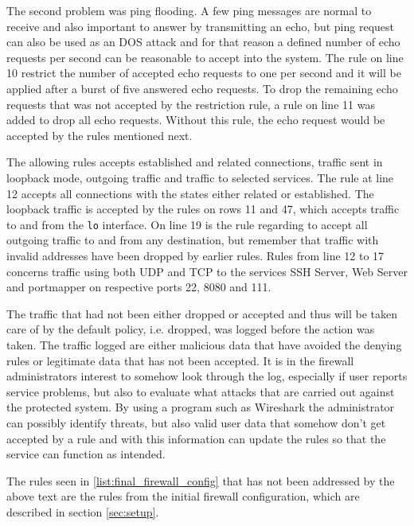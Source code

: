 The second problem was ping flooding. A few ping messages are normal to receive and also important to answer by transmitting an echo, but ping request can also be used as an DOS attack and for that reason a defined number of echo requests per second can be reasonable to accept into the system. The rule on line 10 restrict the number of accepted echo requests to one per second and it will be applied after a burst of five answered echo requests. To drop the remaining echo requests that was not accepted by the restriction rule, a rule on line 11 was added to drop all echo requests. Without this rule, the echo request would be accepted by the rules mentioned next.

The allowing rules accepts established and related connections, traffic sent in loopback mode, outgoing traffic and traffic to selected services. The rule at line 12  accepts all connections with the states either related or established. The loopback traffic is accepted by the rules on rows 11 and 47, which accepts traffic to and from the \texttt{lo} interface. On line 19 is the rule regarding to accept all outgoing traffic to and from any destination, but remember that traffic with invalid addresses have been dropped by earlier rules. Rules from line 12 to 17 concerns traffic using both UDP and TCP to the services SSH Server, Web Server and portmapper on respective ports 22, 8080 and 111.

The traffic that had not been either dropped or accepted and thus will be taken care of by the default policy, i.e. dropped, was logged before the action was taken. The traffic logged are either malicious data that have avoided the denying rules or legitimate data that has not been accepted. It is in the firewall administrators interest to somehow look through the log, especially if user reports service problems, but also to evaluate what attacks that are carried out against the protected system. By using a program such as Wireshark the administrator can possibly identify threats, but also valid user data that somehow don't get accepted by a rule and with this information can update the rules so that the service can function as intended. 

The rules seen in \ref{list:final_firewall_config} that has not been addressed by the above text are the rules from the initial firewall configuration, which are described in section \ref{sec:setup}.

\label{list:final_firewall_config}